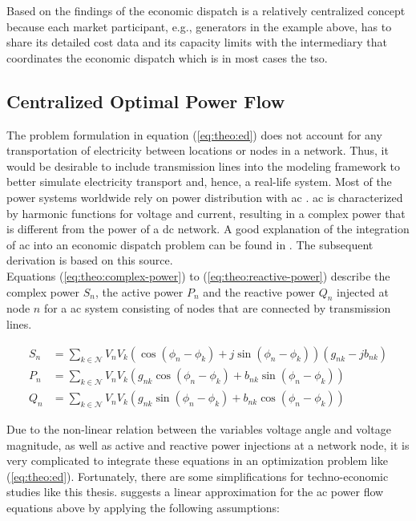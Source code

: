 Based on the findings of \citet{ahlqvist2022} the economic dispatch is a relatively centralized concept because each market participant, e.g., generators in the example above, has to share its detailed cost data and its capacity limits with the intermediary that coordinates the economic dispatch which is in most cases the \gls{tso}. 

\subsection{Centralized Optimal Power Flow}

The problem formulation in equation (\ref{eq:theo:ed}) does not account for any transportation of electricity between locations or nodes in a network. Thus, it would be desirable to include transmission lines into the modeling framework to better simulate electricity transport and, hence, a real-life system. Most of the power systems worldwide rely on power distribution with \gls{ac} \citep{mieth2021}. \gls{ac} is characterized by harmonic functions for voltage and current, resulting in a complex power that is different from the power of a \gls{dc} network. A good explanation of the integration of \gls{ac} into an economic dispatch problem can be found in \citet{weinhold2022}. The subsequent derivation is based on this source.\\ 

Equations (\ref{eq:theo:complex-power}) to (\ref{eq:theo:reactive-power}) describe the complex power $S_n$, the active power $P_n$ and the reactive power $Q_n$ injected at node $n$ for a \gls{ac} system consisting of nodes that are connected by transmission lines.

\begin{subequations}
	\begin{align}
		S_n &= \sum_{k \in \mathcal{N}} V_n V_k(\cos{(\phi_n-\phi_k)} + j\sin{(\phi_n-\phi_k)})(g_{nk} - jb_{nk}) \label{eq:theo:complex-power} \\
		P_n &= \sum_{k \in \mathcal{N}} V_n V_k (g_{nk} \cos{(\phi_n-\phi_k)} + b_{nk}\sin{(\phi_n-\phi_k)}) \\
		Q_n &= \sum_{k \in \mathcal{N}} V_n V_k (g_{nk} \sin{(\phi_n-\phi_k)} + b_{nk} \cos{(\phi_n-\phi_k)}) \label{eq:theo:reactive-power}
	\end{align}
\end{subequations}

Due to the non-linear relation between the variables voltage angle and voltage magnitude, as well as active and reactive power injections at a network node, it is very complicated to integrate these equations in an optimization problem like (\ref{eq:theo:ed}). Fortunately, there are some simplifications for techno-economic studies like this thesis. \citet{vanhertem2006} suggests a linear approximation for the \gls{ac} power flow equations above by applying the following assumptions:

